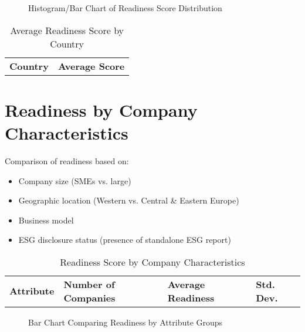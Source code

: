 \begin{figure}[H]
    \centering
    \caption{Histogram/Bar Chart of Readiness Score Distribution}
\end{figure}

\begin{table}[H]
    \centering
    \caption{Average Readiness Score by Country}
    \begin{tabular}{l l}
        \textbf{Country} & \textbf{Average Score} \\
    \end{tabular}
\end{table}

\section{Readiness by Company Characteristics}
Comparison of readiness based on:
\begin{itemize}
    \item Company size (SMEs vs. large)
    \item Geographic location (Western vs. Central \& Eastern Europe)
    \item Business model
    \item ESG disclosure status (presence of standalone ESG report)
\end{itemize}

\begin{table}[H]
    \centering
    \caption{Readiness Score by Company Characteristics}
    \begin{tabular}{l l l l}
        \textbf{Attribute} & \textbf{Number of Companies} & \textbf{Average Readiness} & \textbf{Std. Dev.} \\
    \end{tabular}
\end{table}

\begin{figure}[H]
    \centering
    \caption{Bar Chart Comparing Readiness by Attribute Groups}
\end{figure}

